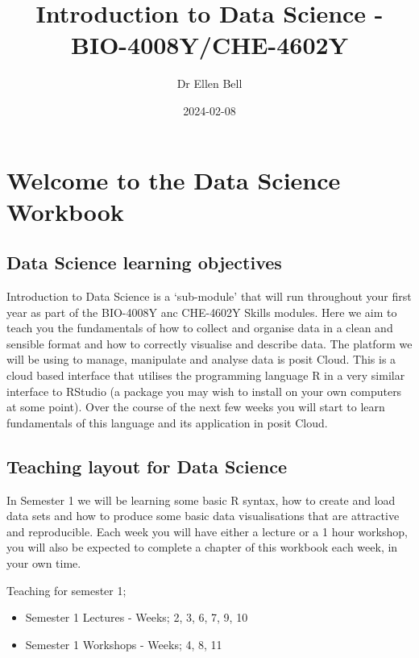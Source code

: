 \documentclass[
]{book}
\title{Introduction to Data Science - BIO-4008Y/CHE-4602Y}
\author{Dr Ellen Bell}
\date{2024-02-08}
\providecommand{\tightlist}{%
  \setlength{\itemsep}{0pt}\setlength{\parskip}{0pt}}
\begin{document}
\maketitle

{
\setcounter{tocdepth}{1}
\tableofcontents
}
\hypertarget{welcome-to-the-data-science-workbook}{%
\chapter{Welcome to the Data Science Workbook}\label{welcome-to-the-data-science-workbook}}

\hypertarget{data-science-learning-objectives}{%
\section{Data Science learning objectives}\label{data-science-learning-objectives}}

Introduction to Data Science is a `sub-module' that will run throughout your first year as part of the BIO-4008Y anc CHE-4602Y Skills modules. Here we aim to teach you the fundamentals of how to collect and organise data in a clean and sensible format and how to correctly visualise and describe data. The platform we will be using to manage, manipulate and analyse data is posit Cloud. This is a cloud based interface that utilises the programming language R in a very similar interface to RStudio (a package you may wish to install on your own computers at some point). Over the course of the next few weeks you will start to learn fundamentals of this language and its application in posit Cloud.

\hypertarget{teaching-layout-for-data-science}{%
\section{Teaching layout for Data Science}\label{teaching-layout-for-data-science}}

In Semester 1 we will be learning some basic R syntax, how to create and load data sets and how to produce some basic data visualisations that are attractive and reproducible. Each week you will have either a lecture or a 1 hour workshop, you will also be expected to complete a chapter of this workbook each week, in your own time.

Teaching for semester 1;

\begin{itemize}
\tightlist
\item
  Semester 1 Lectures - Weeks; 2, 3, 6, 7, 9, 10
\item
  Semester 1 Workshops - Weeks; 4, 8, 11
\end{itemize}
\end{document}
